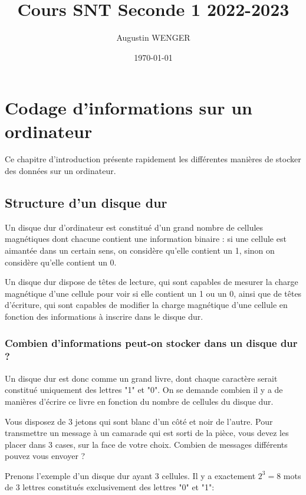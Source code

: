 \documentclass[10pt,a4paper]{book}
\author{Augustin WENGER}
\title{Cours SNT Seconde 1 2022-2023}
\date{\today}
\begin{document}
\maketitle
\tableofcontents
\chapter{Codage d'informations sur un ordinateur}


Ce chapitre d'introduction présente rapidement les différentes manières de stocker des données sur un ordinateur.

\section{Structure d'un disque dur}

Un disque dur d'ordinateur est constitué d'un grand nombre de cellules magnétiques dont chacune contient une information binaire : si une cellule est aimantée dans un certain sens, on considère qu'elle contient un 1, sinon on considère qu'elle contient un 0.

Un disque dur dispose de têtes de lecture, qui sont capables de mesurer la charge magnétique d'une cellule pour voir si elle contient un 1 ou un 0, ainsi que de têtes d'écriture, qui sont capables de modifier la charge magnétique d'une cellule en fonction des informations à inscrire dans le disque dur.


\subsection{Combien d'informations peut-on stocker dans un disque dur ?}

Un disque dur est donc comme un grand livre, dont chaque caractère serait constitué uniquement des lettres "1" et "0". On se demande combien il y a de manières d'écrire ce livre en fonction du nombre de cellules du disque dur.

\begin{act}
    Vous disposez de 3 jetons qui sont blanc d'un côté et noir de l'autre. Pour transmettre un message à un camarade qui est sorti de la pièce, vous devez les placer dans 3 cases, sur la face de votre choix. Combien de messages différents pouvez vous envoyer ?
\end{act}


Prenons l'exemple d'un disque dur ayant 3 cellules. Il y a exactement $2^3=8$ mots de $3$ lettres constitués exclusivement des lettres "0" et "1":
\end{document}
